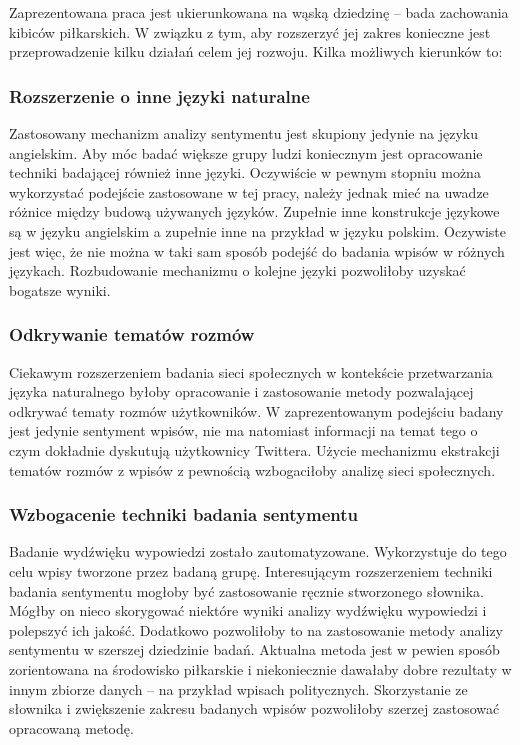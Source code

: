 Zaprezentowana praca jest ukierunkowana na wąską dziedzinę -- bada zachowania
kibiców piłkarskich. W związku z tym, aby rozszerzyć jej zakres konieczne
jest przeprowadzenie kilku działań celem jej rozwoju. Kilka możliwych kierunków to:

\subsubsection{Rozszerzenie o inne języki naturalne}
Zastosowany mechanizm analizy sentymentu jest skupiony jedynie na
języku angielskim. Aby móc badać większe grupy ludzi koniecznym jest opracowanie
techniki badającej również inne języki. Oczywiście w pewnym stopniu można 
wykorzystać podejście zastosowane w tej pracy, należy jednak mieć na uwadze
różnice między budową używanych języków. Zupełnie inne konstrukcje językowe
są w języku angielskim a zupełnie inne na przykład w języku polskim.
Oczywiste jest więc, że nie można w taki sam sposób podejść do badania
wpisów w różnych językach. Rozbudowanie mechanizmu o kolejne języki pozwoliłoby
uzyskać bogatsze wyniki.

\subsubsection{Odkrywanie tematów rozmów}
Ciekawym rozszerzeniem badania sieci społecznych w kontekście przetwarzania
języka naturalnego byłoby opracowanie i zastosowanie metody pozwalającej
odkrywać tematy rozmów użytkowników. W zaprezentowanym podejściu badany jest
jedynie sentyment wpisów, nie ma natomiast informacji na temat tego o czym dokładnie
dyskutują użytkownicy Twittera. Użycie mechanizmu ekstrakcji tematów rozmów
z wpisów z pewnością wzbogaciłoby analizę sieci społecznych.


\subsubsection{Wzbogacenie techniki badania sentymentu}
Badanie wydźwięku wypowiedzi zostało zautomatyzowane. Wykorzystuje do tego celu
wpisy tworzone przez badaną grupę. Interesującym rozszerzeniem techniki badania 
sentymentu mogłoby być zastosowanie ręcznie stworzonego słownika.
Mógłby on nieco skorygować niektóre wyniki analizy wydźwięku wypowiedzi i
polepszyć ich jakość. Dodatkowo pozwoliłoby to na zastosowanie metody analizy sentymentu
w szerszej dziedzinie badań. Aktualna metoda jest w pewien sposób zorientowana
na środowisko piłkarskie i niekoniecznie dawałaby dobre rezultaty w innym
zbiorze danych -- na przykład wpisach politycznych. Skorzystanie ze słownika
i zwiększenie zakresu badanych wpisów pozwoliłoby szerzej zastosować
opracowaną metodę.

